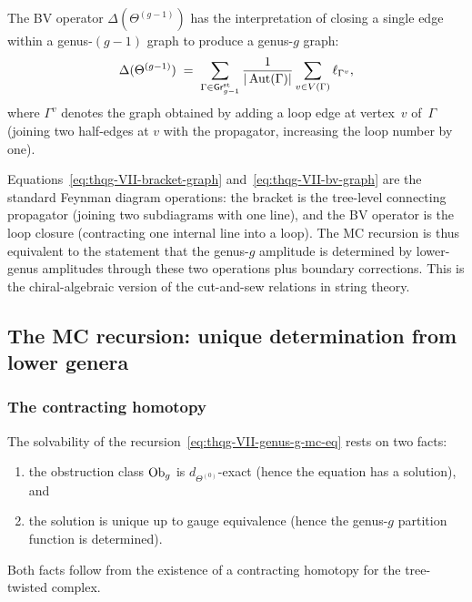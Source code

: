 The BV operator $\Delta(\Theta^{(g-1)})$ has the interpretation
of closing a single edge within a genus-$(g{-}1)$ graph to
produce a genus-$g$ graph:
\begin{equation}\label{eq:thqg-VII-bv-graph}
\Delta(\Theta^{(g-1)})
\;=\;
\sum_{\Gamma \in \mathsf{Gr}_{g-1}^{\mathrm{st}}}
\frac{1}{|\operatorname{Aut}(\Gamma)|}
\sum_{v \in V(\Gamma)}
\ell_{\Gamma^v},
\end{equation}
where $\Gamma^v$ denotes the graph obtained by adding a loop edge
at vertex~$v$ of~$\Gamma$ (joining two half-edges at $v$ with
the propagator, increasing the loop number by one).

\begin{remark}
\label{rem:thqg-VII-feynman-interpretation}
Equations~\eqref{eq:thqg-VII-bracket-graph}
and~\eqref{eq:thqg-VII-bv-graph} are the standard Feynman
diagram operations: the bracket is the tree-level connecting
propagator (joining two subdiagrams with one line), and the BV
operator is the loop closure (contracting one internal line into
a loop). The MC recursion is thus equivalent to the statement
that the genus-$g$ amplitude is determined by lower-genus
amplitudes through these two operations plus boundary corrections.
This is the chiral-algebraic version of the cut-and-sew relations
in string theory.
\end{remark}

%
%

\subsection{The MC recursion: unique determination from lower genera}
\label{subsec:thqg-VII-mc-recursion}

\subsubsection{The contracting homotopy}
\label{subsubsec:thqg-VII-contracting-homotopy}

The solvability of the recursion~\eqref{eq:thqg-VII-genus-g-mc-eq}
rests on two facts:
\begin{enumerate}[label=(\alph*)]
\item the obstruction class $\mathrm{Ob}_g$ is
 $d_{\Theta^{(0)}}$-exact (hence the equation has a
 solution), and
\item the solution is unique up to gauge equivalence
 (hence the genus-$g$ partition function is determined).
\end{enumerate}
Both facts follow from the existence of a contracting homotopy
for the tree-twisted complex.

